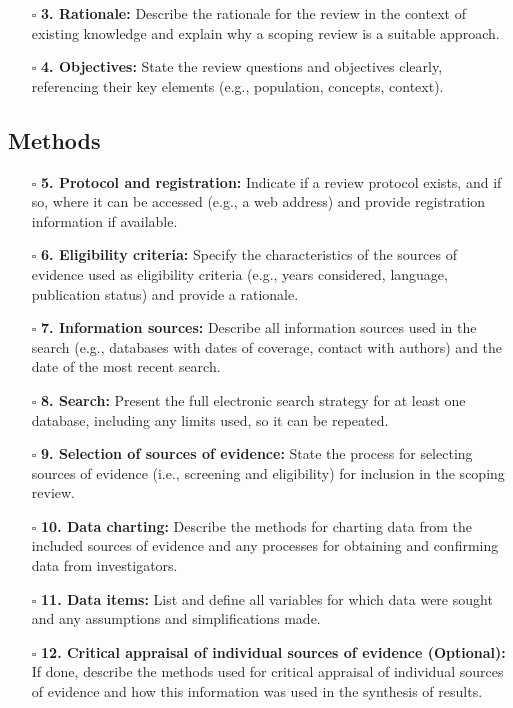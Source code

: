 \documentclass[11pt]{article}
\def\tightlist{}
\begin{document}
\begin{Form}
\begin{itemize}
\tightlist
\item[$\square$]
  \textbf{3. Rationale:} Describe the rationale for the review in the
  context of existing knowledge and explain why a scoping review is a
  suitable approach.
\item[$\square$]
  \textbf{4. Objectives:} State the review questions and objectives
  clearly, referencing their key elements (e.g., population, concepts,
  context).
\end{itemize}

\subsection{Methods}\label{methods}

\begin{itemize}
\tightlist
\item[$\square$]
  \textbf{5. Protocol and registration:} Indicate if a review protocol
  exists, and if so, where it can be accessed (e.g., a web address) and
  provide registration information if available.
\item[$\square$]
  \textbf{6. Eligibility criteria:} Specify the characteristics of the
  sources of evidence used as eligibility criteria (e.g., years
  considered, language, publication status) and provide a rationale.
\item[$\square$]
  \textbf{7. Information sources:} Describe all information sources used
  in the search (e.g., databases with dates of coverage, contact with
  authors) and the date of the most recent search.
\item[$\square$]
  \textbf{8. Search:} Present the full electronic search strategy for at
  least one database, including any limits used, so it can be repeated.
\item[$\square$]
  \textbf{9. Selection of sources of evidence:} State the process for
  selecting sources of evidence (i.e., screening and eligibility) for
  inclusion in the scoping review.
\item[$\square$]
  \textbf{10. Data charting:} Describe the methods for charting data
  from the included sources of evidence and any processes for obtaining
  and confirming data from investigators.
\item[$\square$]
  \textbf{11. Data items:} List and define all variables for which data
  were sought and any assumptions and simplifications made.
\item[$\square$]
  \textbf{12. Critical appraisal of individual sources of evidence
  (Optional):} If done, describe the methods used for critical appraisal
  of individual sources of evidence and how this information was used in
  the synthesis of results.
\end{itemize}


\end{Form}
\end{document}
